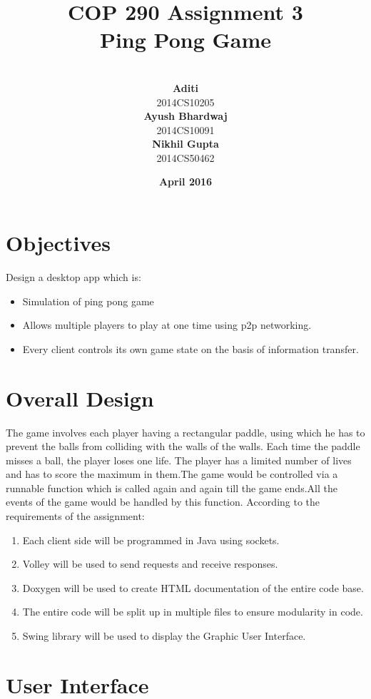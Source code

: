 \documentclass{article}
\title{\vspace*{\fill} \textbf{COP 290 Assignment 3}
	  \\ {\Large \textbf{Ping Pong Game}}
}
\author{
	\vspace{5mm} \\
	 \textbf{Aditi}\\
	2014CS10205 \vspace{2mm} \\
	\textbf{Ayush Bhardwaj}\\ 
	2014CS10091 \vspace{2mm} \\
	\textbf{Nikhil Gupta}\\ 
	2014CS50462 \vspace{2mm}
}
\date{\vspace{3mm} \textbf{April 2016} \vspace*{\fill}}
\begin{document}
	\maketitle

	\newpage

	\tableofcontents

	\newpage

	\section{Objectives}
	Design a desktop app which is:
	\begin{itemize}
	\item Simulation of ping pong game
	\item Allows multiple players to play at one time using p2p networking.
	\item Every client controls its own game state on the basis of information transfer.
	\end{itemize}

	\section{Overall Design}
		The game involves each player having a rectangular paddle, using which he has to prevent the balls from colliding with the walls of the walls. Each time the paddle misses a ball, the player loses one life. The player has a limited number of lives and has to score the maximum in them.The game would be controlled via a runnable function which is called again and again till the game ends.All the events of the game would be handled by this function. According to the requirements of the assignment:
				\begin{enumerate}
			\item Each client side will be programmed in Java using sockets.
			\item Volley will be used to send requests and receive responses.
			\item Doxygen will be used to create HTML documentation of the entire code base.
			\item The entire code will be split up in multiple files to ensure modularity in code.
			\item Swing library will be used to display the Graphic User Interface.
		\end{enumerate}
	\section{User Interface}
	
\end{document}
